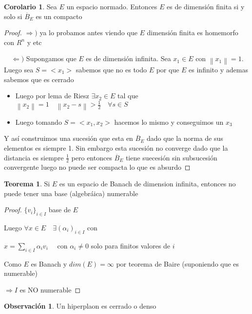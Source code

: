 \documentclass[12pt]{article}
\newcommand{\Ra}{\Rightarrow}
\newcommand{\ol}{\overline}
\newcommand{\norm}[1]{\left\lVert#1\right\rVert}
\theoremstyle{definition}
\newtheorem*{remark}{Observación}
\newtheorem{theorem}{Teorema}
\newtheorem{corollary}{Corolario}[theorem]
\begin{document}
	\begin{corollary}
	  Sea $E$ un espacio normado. Entonces $E$ es de dimensión finita si y solo si $\ol B_{E}$ es un compacto
	
	  \begin{proof}
	  $\Ra)$ ya lo probamos antes viendo que $E$ dimensión finita es homemorfo con $R^n$ y etc

      $\quad \Leftarrow)$ Supongamos que $E$ es de dimensión infinita. Sea $x_{1} \in E$ con $\norm{x_{1}} = 1$. Luego sea $S = <x_{1}> $ sabemos que no es todo $E$ por que $E$ es infinito y ademas sabemos que es cerrado 
      
      \begin{itemize}
		\item Luego por lema de Riesz $\exists x_{2} \in E $ tal que $\norm{x_{2}} = 1 \quad \norm{x_{2} - s} > \frac{1}{2} \quad \forall s \in S$ 

		\item Luego tomando $S=<x_{1},x_{2}>$ hacemos lo mismo y conseguimos un $x_{3}$
	\end{itemize}

      Y así construimos una sucesión que esta en $\ol B_{E}$ dado que la norma de sus elementos es siempre 1. Sin embargo esta sucesión no converge dado que la distancia es siempre $\frac{1}{2}$ pero entonces $\ol B_{E}$ tiene suecesión sin subsucesión convergente luego no puede ser compacta lo que es absurdo
	  \end{proof}

	\end{corollary}

	\begin{theorem}
	  Si $E$ es un espacio de Banach de dimension infinita, entonces no puede tener una base (algebráica) numerable
		\begin{proof}
  			$\{v_{i}\}_{i \in I}$ base de $E$ 
			
			Luego $\forall x \in E \quad \exists (\alpha_{i})_{i \in I}$ con 
			\begin{center}$x = \sum_{i \in I}{\alpha_{i} v_{i}} \quad $ con $ \alpha_{i} \neq 0$ solo para finitos valores de $i$\end{center}
			Como $E$ es Banach y $dim(E) = \infty$ por teorema de Baire (suponiendo que es numerable) 

			$\Ra I$ es NO numerable
		\end{proof}
\end{theorem}

\begin{remark}
  Un hiperplaon es cerrado o denso
\end{remark}
\end{document}
